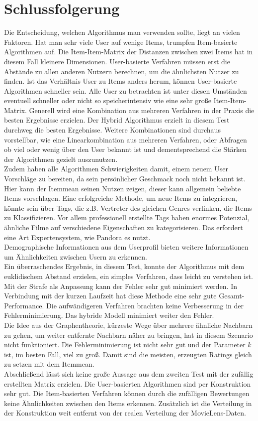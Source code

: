 \section{Schlussfolgerung}
Die Entscheidung, welchen Algorithmus man verwenden sollte, liegt an vielen Faktoren. Hat man sehr viele User auf wenige Items, trumpfen Item-basierte Algorithmen auf. Die Item-Item-Matrix der Distanzen zwischen zwei Items hat in diesem Fall kleinere Dimensionen. User-basierte Verfahren müssen erst die Abstände zu allen anderen Nutzern berechnen, um die ähnlichsten Nutzer zu finden. Ist das Verhältnis User zu Items anders herum, können User-basierte Algorithmen schneller sein. Alle User zu betrachten ist unter diesen Umständen eventuell schneller oder nicht so speicherintensiv wie eine sehr große Item-Item-Matrix. Generell wird eine Kombination aus mehreren Verfahren in der Praxis die besten Ergebnisse erzielen. Der Hybrid Algorithmus erzielt in diesem Test durchweg die besten Ergebnisse. Weitere Kombinationen sind durchaus vorstellbar, wie eine Linearkombination aus mehreren Verfahren, oder Abfragen ob viel oder wenig über den User bekannt ist und dementsprechend die Stärken der Algorithmen gezielt auszunutzen.
\\
Zudem haben alle Algorithmen Schwierigkeiten damit, einem neuem User Vorschläge zu bereiten, da sein persönlicher Geschmack noch nicht bekannt ist. Hier kann der Itemmean seinen Nutzen zeigen, dieser kann allgemein beliebte Items vorschlagen. Eine erfolgreiche Methode, um neue Items zu integrieren, könnte sein über Tags, die z.B. Vertreter des gleichen Genres verlinken, die Items zu Klassifizieren. Vor allem professionell erstellte Tags haben enormes Potenzial, ähnliche Filme auf verschiedene Eigenschaften zu kategorisieren. Das erfordert eine Art Expertensystem, wie Pandora es nutzt.
\\
Demographische Informationen aus dem Userprofil bieten weitere Informationen um Ähnlichkeiten zwischen Usern zu erkennen. 
\\
Ein überraschendes Ergebnis, in diesem Test, konnte der Algorithmus mit dem euklidischem Abstand erzielen, ein simples Verfahren, dass leicht zu verstehen ist. Mit der Strafe als Anpassung kann der Fehler sehr gut minimiert werden. In Verbindung mit der kurzen Laufzeit hat diese Methode eine sehr gute Gesamt-Performance. Die aufwändigeren Verfahren brachten keine Verbesserung in der Fehlerminimierung. Das hybride Modell minimiert weiter den Fehler.
\\
Die Idee aus der Graphentheorie, kürzeste Wege über mehrere ähnliche Nachbarn zu gehen, um weiter entfernte Nachbarn näher zu bringen, hat in diesem Szenario nicht funktioniert. Die Fehlerminimierung ist nicht sehr gut und der Parameter $k$ ist, im besten Fall, viel zu groß. Damit sind die meisten, erzeugten Ratings gleich zu setzen mit dem Itemmean.
\\
Abschließend lässt sich keine große Aussage aus dem zweiten Test mit der zufällig erstellten Matrix erzielen. Die User-basierten Algorithmen sind per Konstruktion sehr gut. Die Item-basierten Verfahren können durch die zufälligen Bewertungen keine Ähnlichkeiten zwischen den Items erkennen. Zusätzlich ist die Verteilung in der Konstruktion weit entfernt von der realen Verteilung der MovieLens-Daten.